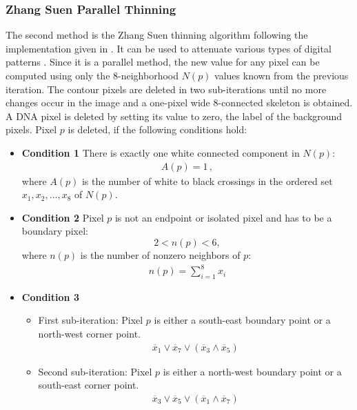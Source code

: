 \documentclass{article}
\begin{document}
\subsubsection{Zhang Suen Parallel Thinning}\label{sec:Zhang Suen Parallel Thinning}
The second method is the Zhang Suen thinning algorithm \cite{zhang1984fast} following the implementation given in \cite{linbo2013implementation}. It can be used to attenuate various types of digital patterns   \cite{widiarti2011comparing}.
Since it is a parallel method, the new value for any pixel can be computed using only the 8-neighborhood $N(p)$ values known from the previous iteration.
The contour pixels are deleted in two sub-iterations until no more changes occur in the image and a one-pixel wide 8-connected skeleton is obtained. A DNA pixel is deleted by setting its value to zero, the label of the background pixels.
Pixel $p$ is deleted, if the following conditions hold:
\begin{itemize}
\item \textbf{Condition 1} There is exactly one white connected component in $N(p)$:
\begin{align*}
A(p) = 1\, ,
\end{align*}
where $A(p)$ is the number of white to black crossings in the ordered set $x_1,x_2,\dots, x_8$ of $N(p)$.
\item \textbf{Condition 2} Pixel $p$ is not an endpoint or isolated pixel and has to be a boundary pixel:
\begin{equation*}
2 < n(p) < 6,
\end{equation*}
where $n(p)$ is the number of nonzero neighbors of $p$:
\begin{align*}
n(p) = \sum_{i=1}^8 x_i
\end{align*}
\item \textbf{Condition 3}
\begin{itemize}
\item First sub-iteration: Pixel $p$ is either a south-east boundary point or a north-west corner point. \begin{align*}
\overline{x}_1 \vee \overline{x}_7 \vee (\overline{x}_3  \wedge \overline{x}_5)
\end{align*}
\item Second sub-iteration: Pixel $p$ is either a north-west boundary point or a south-east corner point. \begin{align*}
\overline{x}_3 \vee \overline{x}_5 \vee (\overline{x}_1 \wedge \overline{x}_7)
\end{align*} 
\end{itemize}
\end{itemize}
\end{document}
